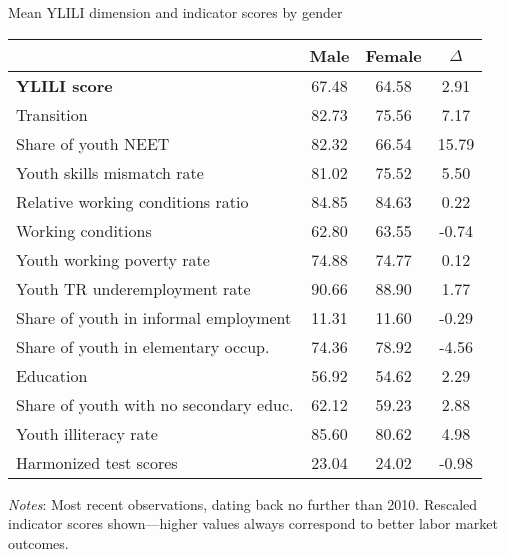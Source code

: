 \begin{singlespace}
\begingroup
\renewcommand*{\arraystretch}{1.241}
\footnotesize{
\begin{center}
\begin{threeparttable}
\caption{\textrm{\normalfont \small Mean YLILI dimension and indicator scores by gender \label{tab:gendermeans}}}
\begin{tabular}{l c c c}
  \hline \hline
 & Male & Female & $\Delta$ \\ 
  \hline
\textbf{YLILI score} & 67.48 & 64.58 & 2.91 \\ 
 Transition & 82.73 & 75.56 & 7.17 \\ 
  \hspace*{1cm} Share of youth NEET & 82.32 & 66.54 & 15.79 \\ 
  \hspace*{1cm} Youth skills mismatch rate & 81.02 & 75.52 & 5.50 \\ 
  \hspace*{1cm} Relative working conditions ratio & 84.85 & 84.63 & 0.22 \\ 
  Working conditions & 62.80 & 63.55 & -0.74 \\ 
  \hspace*{1cm} Youth working poverty rate & 74.88 & 74.77 & 0.12 \\ 
  \hspace*{1cm} Youth TR underemployment rate & 90.66 & 88.90 & 1.77 \\ 
  \hspace*{1cm} Share of youth in informal employment & 11.31 & 11.60 & -0.29 \\ 
  \hspace*{1cm} Share of youth in elementary occup. & 74.36 & 78.92 & -4.56 \\ 
  Education & 56.92 & 54.62 & 2.29 \\ 
  \hspace*{1cm} Share of youth with no secondary educ. & 62.12 & 59.23 & 2.88 \\ 
  \hspace*{1cm} Youth illiteracy rate & 85.60 & 80.62 & 4.98 \\ 
  \hspace*{1cm} Harmonized test scores & 23.04 & 24.02 & -0.98 \\ 
   \hline \hline
\end{tabular}
 \begin{tablenotes}
      \small
      \item \textit{Notes}: Most recent observations, dating back no further than 2010. Rescaled indicator scores shown---higher values always correspond to better labor market outcomes. 
    \end{tablenotes}
\end{threeparttable}
\end{center}
}
\endgroup
\end{singlespace}
